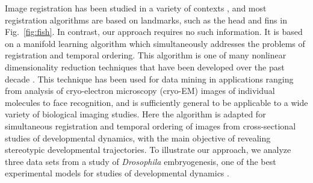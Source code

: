 \documentclass{pnastwo}
\newcommand{\fig}[0]{Fig.}
\begin{document}
\begin{article}
Image registration has been studied in a variety of contexts \cite{zitova2003image, rowley1998rotation, hajnal2010medical, greenspan1994rotation, zhao2003face}, 
and most registration algorithms are based on landmarks, such as the head and fins in \fig~\ref{fig:fish}.
%
In contrast, our approach requires no such information. 
%
It is based on a manifold learning algorithm \cite{singer2012vector} which simultaneously addresses the problems of registration and temporal ordering. 
%
This algorithm is one of many nonlinear dimensionality reduction techniques that have been developed over the past decade \cite{Belkin2003, coifman2005geometric, coifman2006geometric, tenenbaum2000global, roweis2000nonlinear}. 
%
This technique has been used for data mining in
applications ranging from analysis of cryo-electron microscopy (cryo-EM) images of individual molecules to face recognition, and is sufficiently general to be applicable to a wide variety of biological imaging studies. 
%
Here the algorithm is adapted for simultaneous registration and temporal ordering of images from cross-sectional studies of developmental dynamics, with the main objective of revealing stereotypic developmental trajectories.
%
To illustrate our approach, we analyze three data sets from a study of {\it Drosophila} embryogenesis, one of the best experimental models for studies of developmental dynamics \cite{jaeger2012drosophila}.
%
%
%
%

%
%
%
%



\end{article}
\end{document}
